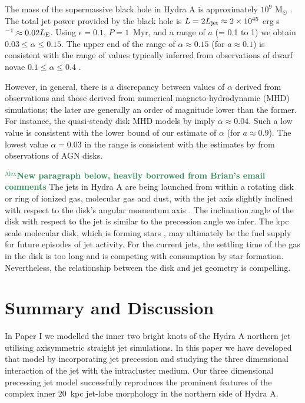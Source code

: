 \documentclass[useAMS, usenatbib]{mn2e}
\newcommand{\noteA}[1]{\textbf{\textcolor{SeaGreen}{$^\mathrm{Alex}$#1}}}
\begin{document}
The mass of the supermassive black hole in Hydra A is approximately $10^9$ M$_{\odot}$ \citep{fujita13}. The total jet power provided by the black hole is $L=2L_{\rm jet}\approx 2 \times 10^{45}$ erg s$^{-1}\approx 0.02L_{\rm E}$. Using $\epsilon = 0.1$, $P=1$~Myr, and a range of $a$ (= 0.1 to 1) we obtain $0.03\le \alpha \le 0.15$. The upper end of the range of $\alpha \approx 0.15$ (for $a \approx 0.1$) is consistent with the range of values typically inferred from observations of dwarf novae $0.1\le \alpha \le 0.4$ \citep{king07}.

However, in general, there is a discrepancy between values of $\alpha$ derived from observations and those derived from numerical magneto-hydrodynamic (MHD) simulations; the later are generally an order of magnitude lower than the former. For instance, the quasi-steady disk MHD models by \citep{parkin13b} imply $\alpha \approx 0.04$. Such a low value is consistent with the lower bound of our estimate of $\alpha$ (for $a\approx 0.9$). The lowest value $\alpha = 0.03$ in the range is consistent with the estimates by \citet{starling04} from observations of AGN disks.

\noteA{New paragraph below, heavily borrowed from Brian's email comments}
The jets in Hydra A are being launched from within a rotating disk or ring of ionized gas, molecular gas and dust, with the jet axis slightly inclined with respect to the disk’s angular momentum axis \citep[see, e.g.,][and references therein]{hamer2014a}. The inclination angle of the disk with respect to the jet is similar to the precession angle we infer. The kpc scale molecular disk, which is forming stars \citep{mcnamara1995a}, may ultimately be the fuel supply for future episodes of jet activity. For the current jets, the settling time of the gas in the disk is too long and is competing with consumption by star formation. Nevertheless, the relationship between the disk and jet geometry is compelling.


% 
%

\section{Summary and Discussion}\label{s:discussion}
In Paper I we modelled the inner two bright knots of the Hydra A northern jet utilising axisymmetric straight jet simulations. In this paper we have developed that model by incorporating jet precession and studying the three dimensional interaction of the jet with the intracluster medium. Our three dimensional precessing jet model successfully reproduces the prominent features of the complex inner 20~kpc jet-lobe morphology in the northern side of Hydra A.  
\end{document}
